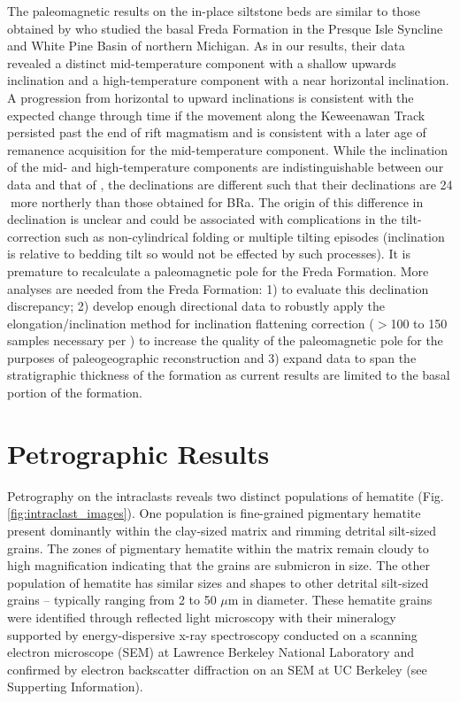 \documentclass[draft]{agujournal2018}
\begin{document}
The paleomagnetic results on the in-place siltstone beds are similar to those obtained by \citet{Henry1977a} who studied the basal Freda Formation in the Presque Isle Syncline and White Pine Basin of northern Michigan. As in our results, their data revealed a distinct mid-temperature component with a shallow upwards inclination and a high-temperature component with a near horizontal inclination. A progression from horizontal to upward inclinations is consistent with the expected change through time if the movement along the Keweenawan Track persisted past the end of rift magmatism \citep{Fairchild2017a, Swanson-Hysell2018a} and is consistent with a later age of remanence acquisition for the mid-temperature component. While the inclination of the mid- and high-temperature components are indistinguishable between our data and that of \citet{Henry1977a}, the declinations are different such that their declinations are 24\textdegree$\;$more northerly than those obtained for BRa. The origin of this difference in declination is unclear and could be associated with complications in the tilt-correction such as non-cylindrical folding or multiple tilting episodes (inclination is relative to bedding tilt so would not be effected by such processes). It is premature to recalculate a paleomagnetic pole for the Freda Formation. More analyses are needed from the Freda Formation: 1) to evaluate this declination discrepancy; 2) develop enough directional data to robustly apply the elongation/inclination method for inclination flattening correction ($>$100 to 150 samples necessary per \citealp{Tauxe2008a}) to increase the quality of the paleomagnetic pole for the purposes of paleogeographic reconstruction and 3) expand data to span the stratigraphic thickness of the formation as current results are limited to the basal portion of the formation.

\section*{Petrographic Results}

Petrography on the intraclasts reveals two distinct populations of hematite (Fig. \ref{fig:intraclast_images}). One population is fine-grained pigmentary hematite present dominantly within the clay-sized matrix and rimming detrital silt-sized grains. The zones of pigmentary hematite within the matrix remain cloudy to high magnification indicating that the grains are submicron in size. The other population of hematite has similar sizes and shapes to other detrital silt-sized grains -- typically ranging from 2 to 50 $\mu$m in diameter. These hematite grains were identified through reflected light microscopy with their mineralogy supported by energy-dispersive x-ray spectroscopy conducted on a scanning electron microscope (SEM) at Lawrence Berkeley National Laboratory and confirmed by electron backscatter diffraction on an SEM at UC Berkeley (see Supperting Information). 
\end{document}
